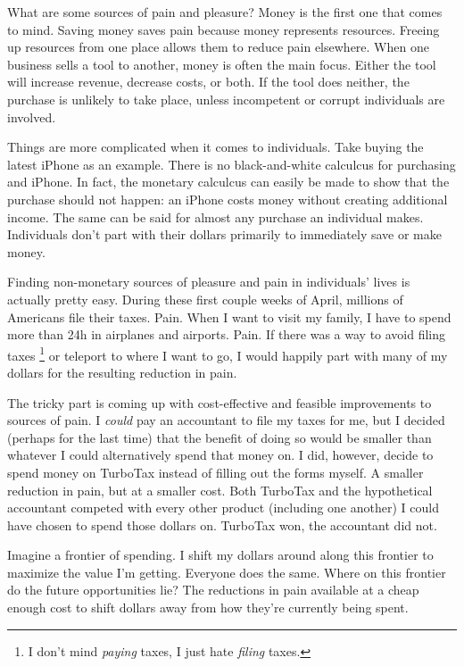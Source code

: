 \documentclass[12pt]{article}  %
\begin{document}
What are some sources of pain and pleasure? Money is the first one that comes to mind. Saving money saves pain because money represents resources. Freeing up resources from one place allows them to reduce pain elsewhere. When one business sells a tool to another, money is often the main focus. Either the tool will increase revenue, decrease costs, or both. If the tool does neither, the purchase is unlikely to take place, unless incompetent or corrupt individuals are involved.

Things are more complicated when it comes to individuals. Take buying the latest iPhone as an example. There is no black-and-white calculcus for purchasing and iPhone. In fact, the monetary calculcus can easily be made to show that the purchase should not happen: an iPhone costs money without creating additional income. The same can be said for almost any purchase an individual makes. Individuals don't part with their dollars primarily to immediately save or make money.

Finding non-monetary sources of pleasure and pain in individuals' lives is actually pretty easy. During these first couple weeks of April, millions of Americans file their taxes. Pain. When I want to visit my family, I have to spend more than 24h in airplanes and airports. Pain. If there was a way to avoid filing taxes \footnote{I don't mind \textit{paying} taxes, I just hate \textit{filing} taxes.} or teleport to where I want to go, I would happily part with many of my dollars for the resulting reduction in pain.

The tricky part is coming up with cost-effective and feasible improvements to sources of pain. I \textit{could} pay an accountant to file my taxes for me, but I decided (perhaps for the last time) that the benefit of doing so would be smaller than whatever I could alternatively spend that money on. I did, however, decide to spend money on TurboTax instead of filling out the forms myself. A smaller reduction in pain, but at a smaller cost. Both TurboTax and the hypothetical accountant competed with every other product (including one another) I could have chosen to spend those dollars on. TurboTax won, the accountant did not. 

Imagine a frontier of spending. I shift my dollars around along this frontier to maximize the value I'm getting. Everyone does the same. Where on this frontier do the future opportunities lie? The reductions in pain available at a cheap enough cost to shift dollars away from how they're currently being spent.
\end{document}
